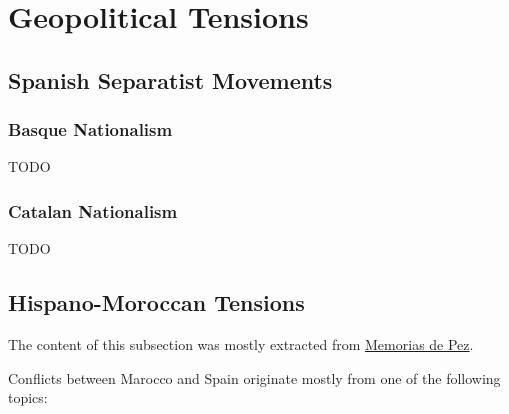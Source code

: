 \documentclass[../my_knowledge.tex]{subfiles}
\begin{document}
\section{Geopolitical Tensions}

\subsection{Spanish Separatist Movements}
\subsubsection{Basque Nationalism}
TODO

\subsubsection{Catalan Nationalism}
TODO

\subsection{Hispano-Moroccan Tensions}
The content of this subsection was mostly extracted from \href{https://www.youtube.com/watch?v=5ADhiE_tES0}{Memorias de Pez}\cite{conflict_morocco_spain}.

Conflicts between Marocco and Spain originate mostly from one of the following topics:
\end{document}
